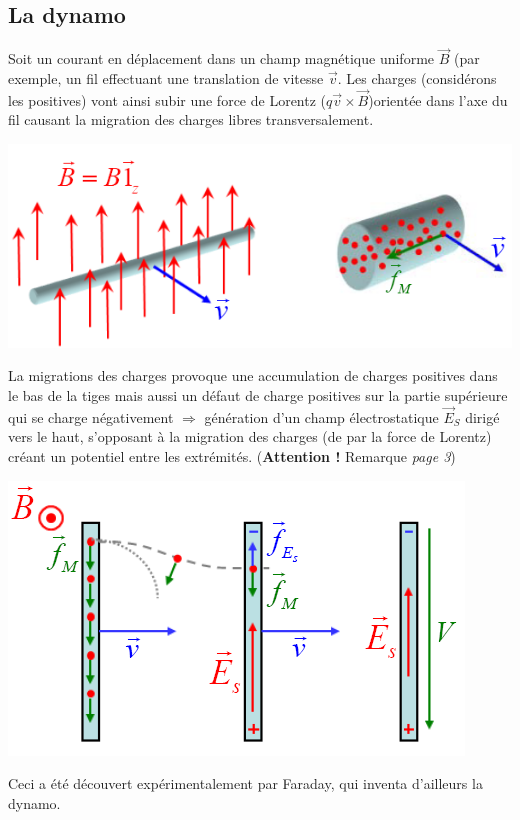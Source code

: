 \documentclass	[11pt, a4paper, openany]{book}
\begin{document}
\subsection{La dynamo}
Soit un courant en déplacement dans un champ magnétique uniforme $\vec{B}$ (par exemple, un fil effectuant une translation de vitesse $\vec{v}$. Les charges (considérons les positives) vont ainsi subir une force de Lorentz ($q\vec{v} \times \vec{B}$)orientée dans l'axe du fil causant la migration des charges libres transversalement.
\begin{center}
\includegraphics[scale=0.35]{em/image0.png}\\
\end{center}
La migrations des charges provoque une accumulation de charges positives dans le bas de la tiges mais aussi un défaut de charge positives sur la partie supérieure qui se charge négativement $\Rightarrow$ génération d'un champ électrostatique $\vec{E}_S$ dirigé vers le haut, s'opposant à la migration des charges (de par la force de Lorentz) créant un potentiel entre les extrémités. (\textbf{Attention !} Remarque \textit{page 3})
\begin{center}
\includegraphics[scale=0.55]{em/image1.png}\\
\end{center}
Ceci a été découvert expérimentalement par Faraday, qui inventa d'ailleurs la dynamo.\\
\end{document}
